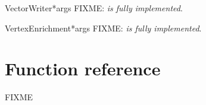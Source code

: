 \documentclass{manual}
\begin{document}
\begin{classdesc}{VectorWriter}{*args}
FIXME: \emph{is fully implemented}.
\end{classdesc}

\begin{classdesc}{VertexEnrichment}{*args}
FIXME: \emph{is fully implemented}.
\end{classdesc}

\section{Function reference}

FIXME

\renewcommand{\indexname}{Index}

\end{document}
